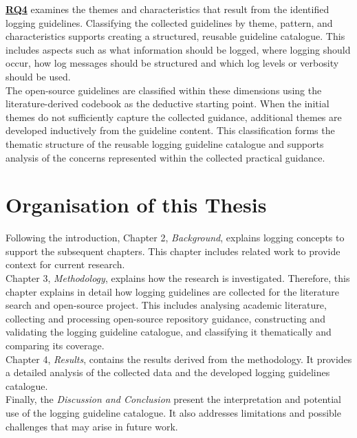 \hyperref[table:t1rq]{\textbf{RQ4}} examines the themes and characteristics that result from the identified logging guidelines.
Classifying the collected guidelines by theme, pattern, and characteristics supports creating a structured, reusable guideline catalogue.
This includes aspects such as what information should be logged, where logging should occur,
how log messages should be structured and which log levels or verbosity should be used.
\\
The open-source guidelines are classified within these dimensions using the literature-derived codebook as the deductive starting point. 
When the initial themes do not sufficiently capture the collected guidance, additional themes are developed inductively from the guideline content.
This classification forms the thematic structure of the reusable logging guideline catalogue and supports analysis of the concerns represented within the collected practical guidance.


\section{Organisation of this Thesis}
Following the introduction, Chapter 2, \textit{Background}, explains logging concepts to support the subsequent chapters.
This chapter includes related work to provide context for current research.
\\
Chapter 3, \textit{Methodology}, explains how the research is investigated.
Therefore, this chapter explains in detail how logging guidelines are collected for the literature search
and open-source project.
This includes analysing academic literature, collecting and processing open-source repository guidance, 
constructing and validating the logging guideline catalogue, and classifying it thematically and comparing its coverage.
\\
Chapter 4, \textit{Results}, contains the results derived from the methodology.
It provides a detailed analysis of the collected data and the developed logging guidelines catalogue.  
\\
Finally, the \textit{Discussion and Conclusion} present the interpretation and potential use of the logging guideline catalogue.
It also addresses limitations and possible challenges that may arise in future work.